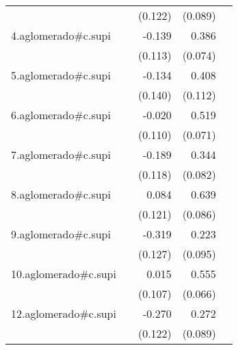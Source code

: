 {\begin{longtable}{l*{4}{D{.}{.}{-1}}}
            &                     &     (0.122)         &     (0.089)         &                     \\
\addlinespace
4.aglomerado#c.supi&                     &      -0.139         &       0.386\sym{***}&                     \\
            &                     &     (0.113)         &     (0.074)         &                     \\
\addlinespace
5.aglomerado#c.supi&                     &      -0.134         &       0.408\sym{***}&                     \\
            &                     &     (0.140)         &     (0.112)         &                     \\
\addlinespace
6.aglomerado#c.supi&                     &      -0.020         &       0.519\sym{***}&                     \\
            &                     &     (0.110)         &     (0.071)         &                     \\
\addlinespace
7.aglomerado#c.supi&                     &      -0.189         &       0.344\sym{***}&                     \\
            &                     &     (0.118)         &     (0.082)         &                     \\
\addlinespace
8.aglomerado#c.supi&                     &       0.084         &       0.639\sym{***}&                     \\
            &                     &     (0.121)         &     (0.086)         &                     \\
\addlinespace
9.aglomerado#c.supi&                     &      -0.319\sym{*}  &       0.223\sym{*}  &                     \\
            &                     &     (0.127)         &     (0.095)         &                     \\
\addlinespace
10.aglomerado#c.supi&                     &       0.015         &       0.555\sym{***}&                     \\
            &                     &     (0.107)         &     (0.066)         &                     \\
\addlinespace
12.aglomerado#c.supi&                     &      -0.270\sym{*}  &       0.272\sym{**} &                     \\
            &                     &     (0.122)         &     (0.089)         &                     \\

\end{longtable}}

